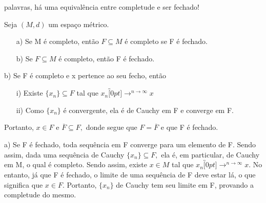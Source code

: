 \documentclass[metric_notes.tex]{subfiles}
\begin{document}
palavras, há uma equivalência entre completude e ser fechado!
\begin{prop*}
	Seja \((M, d)\) um espaço métrico.
	\begin{itemize}
		\item[a)] Se M é completo, então \(F\subseteq{M}\) é completo se F é fechado.
		\item[b)] Se \(F\subseteq{M}\) é completo, então F é fechado.
	\end{itemize}
\end{prop*}
\begin{proof*}
	b) Se F é completo e x pertence ao seu fecho, então
	\begin{itemize}
		\item[i)] Existe \(\{x_{n}\}\subseteq{F}\) tal que \(x_{n}\overbracket[0pt]{\longrightarrow}^{n\to \infty}x\)
		\item[ii)] Como \(\{x_{n}\}\) é convergente, ela é de Cauchy em F e converge em F.
	\end{itemize}
	Portanto, \(x\in F\) e \(\overline{F}\subseteq{F},\) donde segue que \(F = \overline{F}\) e que F é fechado.

	a) Se F é fechado, toda sequência em F converge para um elemento de F. Sendo assim, dada uma sequência de Cauchy \(\{x_{n}\}\subseteq{F},\) ela é,
	em particular, de Cauchy em M, o qual é completo. Sendo assim, existe \(x\in M\) tal que \(x_{n}\overbracket[0pt]{\longrightarrow}^{n\to \infty}x.\) No entanto,
	já que F é fechado, o limite de uma sequência de F deve estar lá, o que significa que \(x\in F\). Portanto, \(\{x_{n}\}\) de Cauchy tem seu limite em F, provando a
	completude do mesmo. \qedsymbol
\end{proof*}
\end{document}
